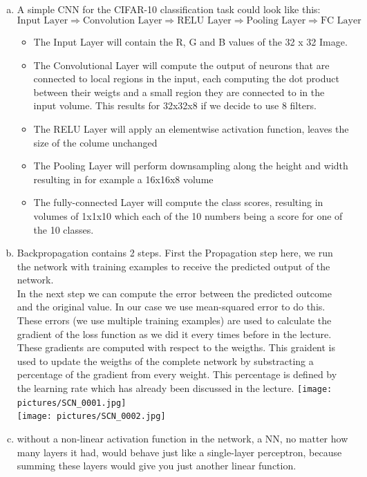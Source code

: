 \documentclass[12pt]{article}
\begin{document}
\subsection{ }
\begin{enumerate}[a)]
    \item 
        A simple CNN for the CIFAR-10 classification task could look like this:
        $$ \text{Input Layer} \Rightarrow \text{Convolution Layer} \Rightarrow \text{RELU Layer} \Rightarrow \text{Pooling Layer} \Rightarrow \text{FC Layer}$$

        \begin{itemize}
            \item 
                The Input Layer will contain the R, G and B values of the 32 x 32 Image. 
            \item
                The Convolutional Layer will compute the output of neurons that are connected to local regions in the input, each computing the dot product between their weigts and a small region they are connected to in the input volume. This results for 32x32x8 if we decide to use 8 filters.
            \item
                The RELU Layer will apply an elementwise activation function, leaves the size of the colume unchanged
            \item
                The Pooling Layer will perform downsampling along the height and width resulting in for example a 16x16x8 volume
            \item
                The fully-connected Layer will compute the class scores, resulting in volumes of 1x1x10 which each of the 10 numbers being a score for one of the 10 classes.
        \end{itemize}
    \item
    	Backpropagation contains 2 steps. First the Propagation step here, we run the network with training examples to receive the predicted output of the network. \\
    	In the next step we can compute the error between the predicted outcome and the original value. In our case we use mean-squared error to do this.\\
    	These errors (we use multiple training examples) are used to calculate the gradient of the loss function as we did it every times before in the lecture.\\
    	These gradients are computed with respect to the weigths. This graident is used to update the weigths of the complete network by substracting a percentage of the gradient from every weight. This percentage is defined by the learning rate which has already been discussed in the lecture.
    	\newpage
	\texttt{[image: pictures/SCN\_0001.jpg]}\\
	\texttt{[image: pictures/SCN\_0002.jpg]}\\
    \item
        without a non-linear activation function in the network, a NN, no matter how many layers it had, would behave just like a single-layer perceptron, because summing these layers would give you just another linear function.\\


\end{enumerate}
\end{document}
